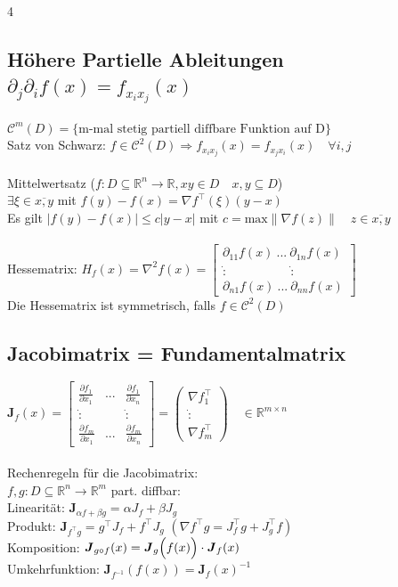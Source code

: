 \documentclass[6pt,a4paper]{scrartcl}
\let\olddot = \dot
\newcommand{\eset}[1]{\ensuremath{\bigl\{#1\bigr\}}}                                            %
\newcommand{\norm}[1]{\ensuremath{\|#1\|}}                                                      %
\newcommand{\ma}[1]{\ensuremath{\boldsymbol {#1}}}                                              %
\newcommand{\svdots}{\ensuremath{\olddot :}}                                                    %
\renewcommand*{\dot}[1]{\accentset{\mbox{\textrm{\large\bfseries .}} }{#1}}                     %
\begin{document}
\begin{multicols*}{4}
    \subsection{Höhere Partielle Ableitungen $\partial_j \partial_i f(x) = f_{x_i x_j} (x)$}
    $\mathcal C^m (D) = \eset{\text{m-mal stetig partiell diffbare Funktion auf D}}$\\
    Satz von Schwarz: $f \in \mathcal C^2 (D) \Rightarrow f_{x_i x_j} (x)= f_{x_j x_i} (x) \quad \forall i,j$\\
    \\
    Mittelwertsatz ($f:D\subseteq \mathbb R^n \rightarrow \mathbb R, xy \in D \quad x,y \subseteq D$)\\
    $\exists \xi \in \overline{x,y}$ mit $f(y)-f(x)=\nabla f^\top (\xi)(y-x)$\\
    Es gilt $|f(y) - f(x)| \le c|y-x|$ mit $c= \mathrm{max} \norm{\nabla f(z)} \quad z \in \overline{x,y}$\\
    \\
    Hessematrix: $H_f (x) = \nabla^2 f(x) = \begin{bmatrix} \partial_{11} f(x)\ ...\ \partial_{1n} f(x) \\ \svdots \quad \qquad \qquad \svdots \\ \partial_{n1} f(x)\ ...\ \partial_{nn} f(x) \end{bmatrix}$\\
    Die Hessematrix ist symmetrisch, falls $f \in \mathcal C^2(D)$

    \subsection{Jacobimatrix = Fundamentalmatrix}
    $\ma J_f (x) = \begin{bmatrix} \frac{\partial f_1}{\partial x_1} & ... & \frac{\partial f_1}{\partial x_n} \\ \svdots & & \svdots \\ \frac{\partial f_m}{\partial x_1} & ... & \frac{\partial f_m}{\partial x_n} \end{bmatrix} = \begin{pmatrix} \nabla f_1^\top \\ \svdots \\ \nabla f_m^\top \end{pmatrix}  \quad \in \mathbb R^{m \times n}$\\ \\
    Rechenregeln für die Jacobimatrix:\\
    $f,g: D \subseteq \mathbb R^n \rightarrow \mathbb R^m$ part. diffbar:\\
    Linearität: $\ma J_{\alpha f + \beta g} = \alpha J_f + \beta J_g$\\
    Produkt: $\ma J_{f^\top g} = g^\top J_f + f^\top J_g$ \quad $(\nabla f^\top g = J_f^\top g + J_g^\top f)$\\
    Komposition: $\ma J_{g \circ f}(x) = \ma J_g\Bigl(f(x)\Bigr) \cdot \ma J_f(x)$\\
    Umkehrfunktion: $\ma J_{f^{-1}} (f(x)) = \ma J_f (x)^{-1}$


\end{multicols*}
\end{document}
